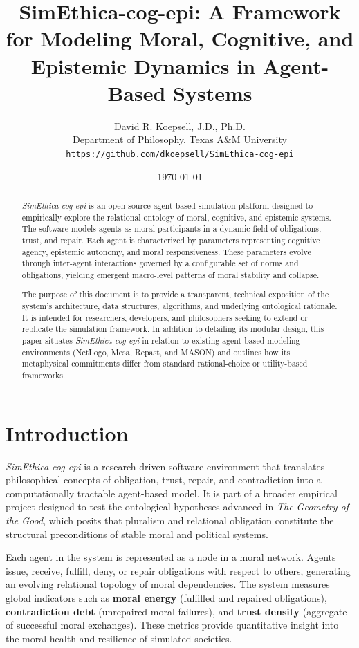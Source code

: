 \documentclass[11pt]{article}
\title{\textbf{SimEthica-cog-epi: A Framework for Modeling Moral, Cognitive, and Epistemic Dynamics in Agent-Based Systems}}
\author{David R. Koepsell, J.D., Ph.D.\\
Department of Philosophy, Texas A\&M University\\
\texttt{https://github.com/dkoepsell/SimEthica-cog-epi}}
\date{\today}
\begin{document}
\maketitle
\tableofcontents
\newpage

\begin{abstract}
\noindent
\textit{SimEthica-cog-epi} is an open-source agent-based simulation platform designed to empirically explore the relational ontology of moral, cognitive, and epistemic systems. The software models agents as moral participants in a dynamic field of obligations, trust, and repair. Each agent is characterized by parameters representing cognitive agency, epistemic autonomy, and moral responsiveness. These parameters evolve through inter-agent interactions governed by a configurable set of norms and obligations, yielding emergent macro-level patterns of moral stability and collapse.

The purpose of this document is to provide a transparent, technical exposition of the system’s architecture, data structures, algorithms, and underlying ontological rationale. It is intended for researchers, developers, and philosophers seeking to extend or replicate the simulation framework. In addition to detailing its modular design, this paper situates \textit{SimEthica-cog-epi} in relation to existing agent-based modeling environments (NetLogo, Mesa, Repast, and MASON) and outlines how its metaphysical commitments differ from standard rational-choice or utility-based frameworks.
\end{abstract}

\section{Introduction}

\textit{SimEthica-cog-epi} is a research-driven software environment that translates philosophical concepts of obligation, trust, repair, and contradiction into a computationally tractable agent-based model. It is part of a broader empirical project designed to test the ontological hypotheses advanced in \textit{The Geometry of the Good}, which posits that pluralism and relational obligation constitute the structural preconditions of stable moral and political systems.

Each agent in the system is represented as a node in a moral network. Agents issue, receive, fulfill, deny, or repair obligations with respect to others, generating an evolving relational topology of moral dependencies. The system measures global indicators such as \textbf{moral energy} (fulfilled and repaired obligations), \textbf{contradiction debt} (unrepaired moral failures), and \textbf{trust density} (aggregate of successful moral exchanges). These metrics provide quantitative insight into the moral health and resilience of simulated societies.
\end{document}
